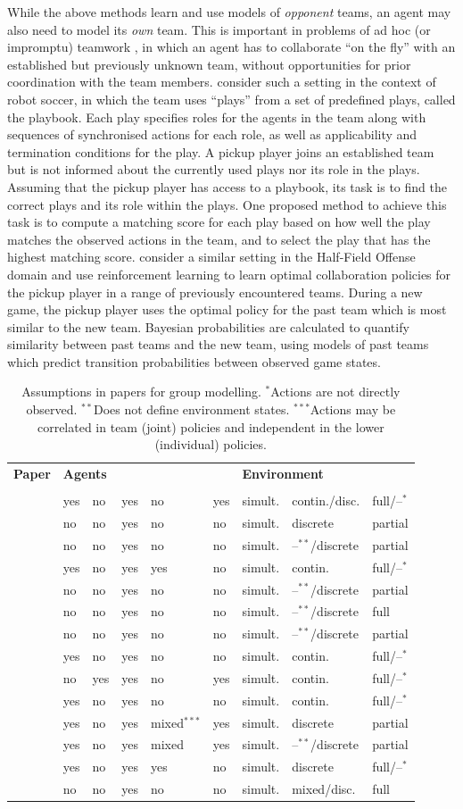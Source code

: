 \documentclass[final,1p,times,authoryear]{elsarticle}
\makeatletter
\newcommand{\nil}{@{}}
\newcommand{\nl}{\newline}
\newcommand{\rbox}[2]{\rotatebox{45}{\parbox{#1\textwidth}{#2}}}
\newcommand{\btab}{
	\center
	\scriptsize
	\bgroup\def\arraystretch{1.2}
	\begin{tabular}{\nil p{0.32\textwidth} @{\hspace{11pt}} l \nil l \nil l \nil l \nil l \nil l \nil l \nil l \nil}
		\toprule
		\bf Paper	& \multicolumn{5}{l}{\hspace{-5pt}\bf Agents} & \multicolumn{3}{l}{\hspace{-5pt}\bf Environment} \\[-5pt]
				& \rbox{0.075}{Stochastic \nl actions?} & \rbox{0.075}{Changing \nl behaviour?} & \rbox{0.075}{Factors \nl known?} & \rbox{0.07}{Independent \nl agents?} & \rbox{0.06}{Common \nl goals?} & \rbox{0.10}{Move order} & \rbox{0.11}{State/action \nl representation} & \rbox{0.09}{State/action \nl observability} \\
		\midrule}
\newcommand{\tabrow}[9]{\citep{#1} & #2 & #3 & #4 & #5 & #6 & #7 & #8 & #9 \\}
\newcommand{\etab}{
		\bottomrule
	\end{tabular}
	\egroup}
\newcommand{\si}{simult.}
\newcommand{\as}{$^{*}$}
\newcommand{\ass}{$^{**}$}
\newcommand{\asss}{$^{***}$}
\makeatother
\begin{document}
While the above methods learn and use models of \emph{opponent} teams, an agent may also need to model its \emph{own} team. This is important in problems of ad hoc (or impromptu) teamwork \citep{skkr2010,bm2005}, in which an agent has to collaborate ``on the fly'' with an established but previously unknown team, without opportunities for prior coordination with the team members. \citet{bm2005} consider such a setting in the context of robot soccer, in which the team uses ``plays'' from a set of predefined plays, called the playbook. Each play specifies roles for the agents in the team along with sequences of synchronised actions for each role, as well as applicability and termination conditions for the play. A pickup player joins an established team but is not informed about the currently used plays nor its role in the plays. Assuming that the pickup player has access to a playbook, its task is to find the correct plays and its role within the plays. One proposed method to achieve this task is to compute a matching score for each play based on how well the play matches the observed actions in the team, and to select the play that has the highest matching score. \citet{bs2015} consider a similar setting in the Half-Field Offense domain \citep{hfo2016} and use reinforcement learning to learn optimal collaboration policies for the pickup player in a range of previously encountered teams. During a new game, the pickup player uses the optimal policy for the past team which is most similar to the new team. Bayesian probabilities are calculated to quantify similarity between past teams and the new team, using models of past teams which predict transition probabilities between observed game states.

\begin{table}[t]
	\btab
		\tabrow{bs2015}{yes}{no}{yes}{no}{yes}{\si}{contin./disc.}{full/--\as}
		\tabrow{zyk2012}{no}{no}{yes}{no}{no}{\si}{discrete}{partial}
		\tabrow{bk2011}{no}{no}{yes}{no}{no}{\si}{--\ass/discrete}{partial}
		\tabrow{ev2011}{yes}{no}{yes}{yes}{no}{\si}{contin.}{full/--\as}
		\tabrow{zl2011}{no}{no}{yes}{no}{no}{\si}{--\ass/discrete}{partial}
		\tabrow{bkl2010}{no}{no}{yes}{no}{no}{\si}{--\ass/discrete}{full}
		\tabrow{ss2008}{no}{no}{yes}{no}{no}{\si}{--\ass/discrete}{partial}
		\tabrow{kks2006}{yes}{no}{yes}{no}{no}{\si}{contin.}{full/--\as}
		\tabrow{bm2005}{no}{yes}{yes}{no}{yes}{\si}{contin.}{full/--\as}
		\tabrow{lmvh2005}{yes}{no}{yes}{no}{no}{\si}{contin.}{full/--\as}
		\tabrow{sm2004}{yes}{no}{yes}{mixed\asss}{yes}{\si}{discrete}{partial}
		\tabrow{kpt2002}{yes}{no}{yes}{mixed}{yes}{\si}{--\ass/discrete}{partial}
		\tabrow{rv2001}{yes}{no}{yes}{yes}{no}{\si}{discrete}{full/--\as}
		\tabrow{t1996}{no}{no}{yes}{no}{no}{\si}{mixed/disc.}{full}
	\etab
	\caption{Assumptions in papers for group modelling. \as Actions are not directly observed. \ass Does not define environment states. \asss Actions may be correlated in team (joint) policies and independent in the lower (individual) policies.}
	\label{tab:groupmod}
\end{table}
\end{document}
